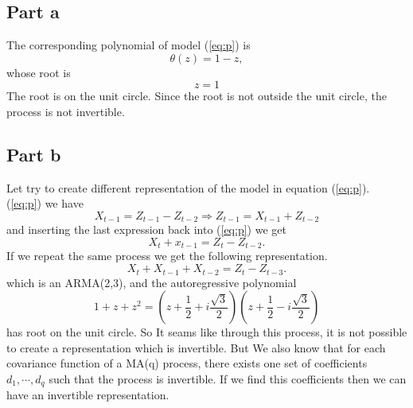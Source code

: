 \documentclass[11pt, oneside]{article}   	%
\begin{document}
\subsection{Part a}
The corresponding polynomial of model (\ref{eq:p}) is
\begin{equation}
\theta(z) = 1-z,
\end{equation}
whose root is
\begin{equation}
z = 1
\end{equation}
The root is on the unit circle. Since the root is not outside the unit circle, the process is not invertible.
\subsection{Part b}
Let try to create different representation of  the model in equation (\ref{eq:p}).
(\ref{eq:p}) we have 
\begin{equation} \label{eq:p1}
X_{t-1} = Z_{t-1} - Z_{t-2} \Rightarrow Z_{t-1} = X_{t-1} + Z_{t-2}
\end{equation}
and inserting the last expression back into (\ref{eq:p}) we get 
\begin{equation} \label{eq:pqw}
X_{t}+x_{t-1} = Z_{t} - Z_{t-2}.
\end{equation}
If we repeat the same process we get the following representation.
\begin{equation} \label{eq:p}
X_{t} +X_{t-1} + X_{t-2}= Z_{t} - Z_{t-3}.
\end{equation}
which is an ARMA(2,3), and the autoregressive polynomial 
\begin{equation} \label{eq:p00}
1+z+z^{2} = \left(z+\frac{1}{2}+ i\frac{\sqrt{3}}{2}\right) \left(z+\frac{1}{2}- i\frac{\sqrt{3}}{2}\right)
\end{equation}
has root on the unit circle. So It seams like through this process, it is not possible to create a representation which is invertible. But We also know that for each covariance function of a MA(q) process, there
exists one set of coefficients $d_{1}, \cdots, d_{q}$ such that the process is invertible. If we find this coefficients then we can have an invertible representation.
\end{document}
